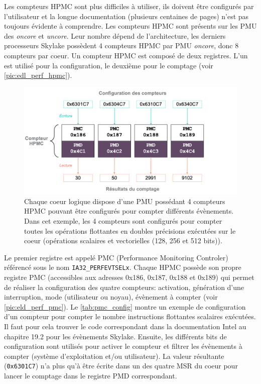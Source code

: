             Les compteurs HPMC sont plus difficiles à utiliser, ils doivent être configurés par l'utilisateur et la longue documentation (plusieurs centaines de pages) n'est pas toujours évidente à comprendre. Les compteurs HPMC sont présents sur les PMU des \textit{oncore} et \textit{uncore}. Leur nombre dépend de l'architecture, les derniers processeurs Skylake possèdent 4 compteurs HPMC par PMU \textit{oncore}, donc 8 compteurs par coeur. Un compteur HPMC est composé de deux registres. L'un est utilisé pour la configuration, le deuxième pour le comptage (voir \autoref{pic:edl_perf_hpmc}).
        
            \begin{figure}[h!]
            \center
            \includegraphics[width=14cm]{images/edl_perf_hpmc.png}
            \caption{\label{pic:edl_perf_hpmc} Chaque coeur logique dispose d'une PMU possédant 4 compteurs HPMC pouvant être configurés pour compter différents évènements. Dans cet exemple, les 4 compteurs sont configurés pour compter toutes les opérations flottantes en doubles précisions exécutées sur le coeur (opérations scalaires et vectorielles (128, 256 et 512 bits)).}
            \end{figure}
            
            Le premier registre est appelé PMC (Performance Monitoring Controler) référencé sous le nom \verb|IA32_PERFEVTSELx|. Chaque HPMC possède son propre registre PMC (accessibles aux adresses 0x186, 0x187, 0x188 et 0x189) qui permet de réaliser la configuration des quatre compteurs: activation, génération d'une interruption, mode (utilisateur ou noyau), évènement à compter (voir \autoref{pic:eld_perf_pmc}). Le \autoref{tab:pmc_config} montre un exemple de configuration d'un compteur pour compter le nombre instructions flottantes scalaires exécutées. Il faut pour cela trouver le code correspondant dans la documentation Intel \cite{Intel2018} au chapitre 19.2 pour les évènements Skylake. Ensuite, les différents bits de configuration sont utilisés pour activer le compteur et filtrer les évènements à compter (système d'exploitation et/ou utilisateur). La valeur résultante (\verb|0x6301C7|) n'a plus qu'à être écrite dans un des quatre MSR du coeur pour lancer le comptage dans le registre PMD correspondant.
            
